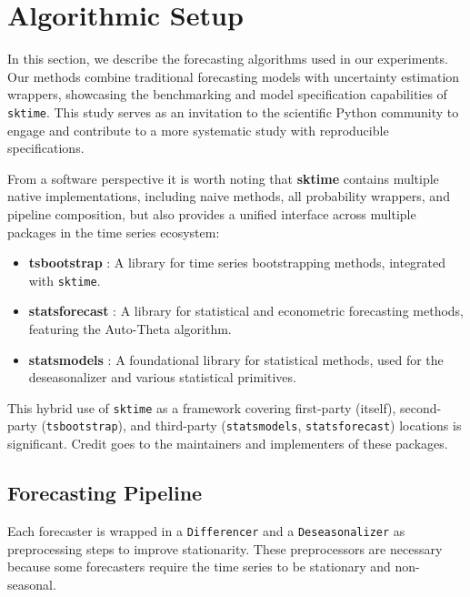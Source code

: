 \section{Algorithmic Setup} \label{methods}

In this section, we describe the forecasting algorithms used in our experiments. Our methods combine traditional forecasting models with uncertainty estimation wrappers, showcasing the benchmarking and model specification capabilities of \texttt{sktime}. This study serves as an invitation to the scientific Python community to engage and contribute to a more systematic study with reproducible specifications.

From a software perspective it is worth noting that \textbf{sktime} \cite{loning2019sktime, franz_kiraly_2024_11095261_sktime} contains multiple native implementations, including naive methods, all probability wrappers, and pipeline composition, but also provides a unified interface across multiple packages in the time series ecosystem:

\begin{itemize}
    \item \textbf{tsbootstrap} \cite{gilda_2024_10866090_tsbootstrap, gilda2024tsbootstrap}: A library for time series bootstrapping methods, integrated with \texttt{sktime}.
    \item \textbf{statsforecast} \cite{garza2022statsforecast}: A library for statistical and econometric forecasting methods, featuring the Auto-Theta algorithm.
    \item \textbf{statsmodels} \cite{seabold2010statsmodels}: A foundational library for statistical methods, used for the deseasonalizer and various statistical primitives.
\end{itemize}

This hybrid use of \texttt{sktime} as a framework covering first-party (itself), second-party (\texttt{tsbootstrap}), and third-party (\texttt{statsmodels}, \texttt{statsforecast}) locations is significant. Credit goes to the maintainers and implementers of these packages.

\subsection{Forecasting Pipeline}
Each forecaster is wrapped in a \texttt{Differencer} and a \texttt{Deseasonalizer} as preprocessing steps to improve stationarity. These preprocessors are necessary because some forecasters require the time series to be stationary and non-seasonal.

